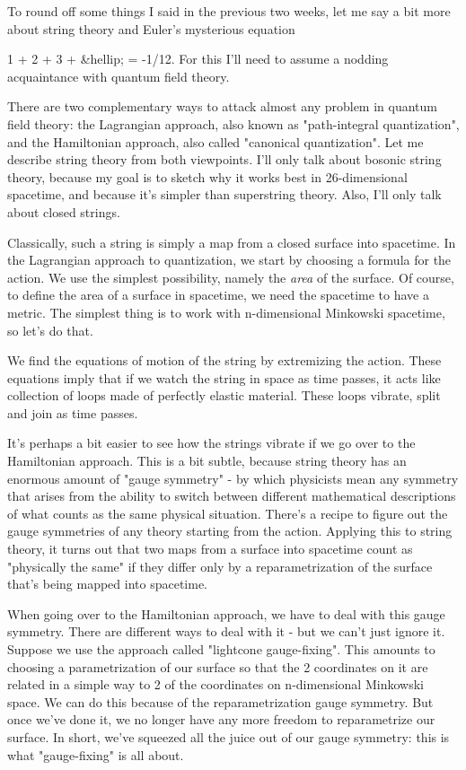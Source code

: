 


To round off some things I said in the previous two weeks, let me
say a bit more about string theory and Euler's mysterious equation

                      1 + 2 + 3 + &hellip; = -1/12.  
For this I'll need to assume a nodding acquaintance with quantum field 
theory.   

There are two complementary ways to attack almost any problem in 
quantum field theory: the Lagrangian approach, also known as 
"path-integral quantization", and the Hamiltonian approach, 
also called
"canonical quantization".  Let me describe string theory from both 
viewpoints.  I'll only talk about bosonic string theory, because my goal
is to sketch why it works best in 26-dimensional spacetime, and because
it's simpler than superstring theory.  Also, I'll only talk about
closed strings.  

Classically, such a string is simply a map from a closed surface into
spacetime.   In the Lagrangian approach to quantization, we start by
choosing a formula for the action.  We use the simplest possibility,
namely the \emph{area} of the surface.  Of course, to define the area of a
surface in spacetime, we need the spacetime to have a metric.  The
simplest thing is to work with n-dimensional Minkowski spacetime, so
let's do that.

We find the equations of motion of the string by extremizing the action.
These equations imply that if we watch the string in space as time 
passes, it acts like collection of loops made of perfectly elastic
material.  These loops vibrate, split and join as time passes. 

It's perhaps a bit easier to see how the strings vibrate if we go over
to the Hamiltonian approach.  This is a bit subtle, because string theory
has an enormous amount of "gauge symmetry" - by which physicists mean
any symmetry that arises from the ability to switch between different
mathematical descriptions of what counts as the same physical situation.
There's a recipe to figure out the gauge symmetries of any theory
starting from the action.  Applying this to string theory,  it turns out
that two maps from a surface into spacetime count as "physically the
same" if they differ only by a reparametrization of the surface that's
being mapped into spacetime.  

When going over to the Hamiltonian approach, we have to deal with this
gauge symmetry.  There are different ways to deal with it - but we
can't just ignore it.  Suppose we use the approach called "lightcone
gauge-fixing".  This amounts to choosing a parametrization of our 
surface so that the 2 coordinates on it are related in a simple way to
2 of the coordinates on n-dimensional Minkowski space.  We can do this
because of the reparametrization gauge symmetry.  But once we've done
it, we no longer have any more freedom to reparametrize our surface.  In
short, we've squeezed all the juice out of our gauge symmetry: this is
what "gauge-fixing" is all about.

